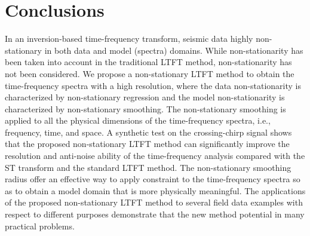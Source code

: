 %
%
%
%




\section{Conclusions}
In an inversion-based time-frequency transform, seismic data  highly non-stationary in both data and model (spectra) domains. While  non-stationarity has been taken into account in the traditional LTFT method,  non-stationarity has not been considered. We propose a non-stationary LTFT method to obtain the time-frequency spectra with a high resolution, where the data non-stationarity is characterized by non-stationary regression and the model non-stationarity is characterized by non-stationary smoothing. The non-stationary smoothing is applied to all the physical dimensions of the time-frequency spectra, i.e., frequency, time, and space. A synthetic test on the crossing-chirp signal shows that the proposed non-stationary LTFT method can significantly improve the resolution and anti-noise ability of the time-frequency analysis compared with the ST transform and the standard LTFT method. The non-stationary smoothing radius  offer an effective way to apply  constraint to the time-frequency spectra so as to obtain a model domain that is more physically meaningful. The applications of the proposed non-stationary LTFT method to several field data examples with respect to different purposes demonstrate that the new method  potential in many practical problems.

